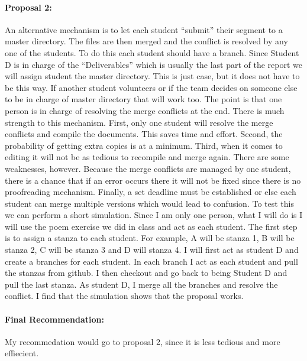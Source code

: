 \documentclass[12pt]{article}
\begin{document}
\paragraph {Proposal 2: }
An alternative mechanism is to let each student “submit” their segment to a master directory.  The files are then merged and the conflict is resolved by any one of the students. To do this each student should have a branch. Since Student D is in charge of the “Deliverables” which is usually the last part of the report we will assign student the master directory. This is just case, but it does not have to be this way. If another student volunteers or if the team decides on someone else to be in charge of master directory that will work too. The point is that one person is in charge of resolving the merge conflicts at the end.
\newline 
\newline 
There is much strength to this mechanism. First, only one student will resolve the merge conflicts and compile the documents. This saves time and effort.  Second, the probability of getting extra copies is at a minimum. Third, when it comes to editing it will not be as tedious to recompile and merge again. There are some weaknesses, however.  Because the merge conflicts are managed by one student, there is a chance that if an error occurs there it will not be fixed since there is no proofreading mechanism. Finally, a set deadline must be established or else each student can merge multiple versions which would lead to confusion. 
\newline 
\newline 
To test this we can perform a short simulation. Since I am only one person, what I will do is I will use the poem exercise we did in class and act as each student. The first step is to assign a stanza to each student. For example, A will be stanza 1, B will be stanza 2, C will be stanza 3 and D will stanza 4.  I will first act as student D and create a branches for each student. In each branch I act as each student and pull the stanzas from github. I then checkout and go back to being Student D and pull the last stanza. As student D, I merge all the branches and resolve the conflict. I find that the simulation shows that the proposal works. 

\paragraph {Final Recommendation:} 
My recommedation would go to proposal 2, since it is less tedious and more effiecient.
\end{document}
